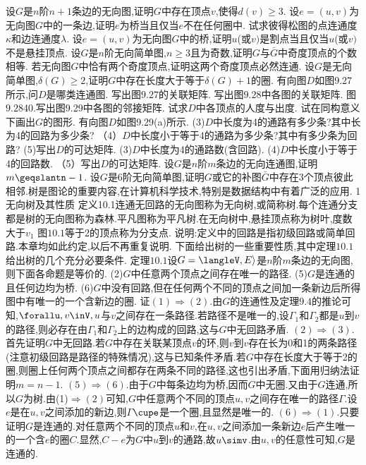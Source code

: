 设$G$是$n$阶$n+1$条边的无向图,证明$G$中存在顶点$v$,使得$d(v)\geqslant3$.
设$e=(u,v)$为无向图$G$中的一条边,证明$e$为桥当且仅当$e$不在任何圈中.
试求彼得松图的点连通度$\kappa$和边连通度$\lambda$.
设$e=(u,v)$为无向图$G$中的桥,证明$u$(或$v)$是割点当且仅当$u$(或$v)$不是悬挂顶点.
设$G$是$n$阶无向简单图,$n\geqslant3$且为奇数,证明$G$与$\bar{G}$中奇度顶点的个数相等.
若无向图$G$中恰有两个奇度顶点,证明这两个奇度顶点必然连通.
设$G$是无向简单图,$\delta(G)\geqslant2$,证明$G$中存在长度大于等于$\delta(G)+1$的圈.
有向图$D$如图9.27所示,问$D$是哪类连通图.
写出图$9.27$的关联矩阵.
写出图$9.28$中各图的关联矩阵.
图$9.28$40.写出图9.29中各图的邻接矩阵.
试求$D$中各顶点的人度与出度.
试在同构意义下画出$G$的图形.
有向图$D$如图9.29(a)所示.
(3)$D$中长度为4的通路有多少条?其中长为4的回路为多少条?
（4）$D$中长度小于等于4的通路为多少条?其中有多少条为回路?
(5)写出$D$的可达矩阵.
(3)$D$中长度为4的通路数(含回路).
(4)$D$中长度小于等于4的回路数.
（5）写出$D$的可达矩阵.
设$G$是$n$阶$m$条边的无向连通图,证明$m\geqslantn-1$.
设$G$是6阶无向简单图,证明$G$或它的补图$\bar{G}$中存在3个顶点彼此相邻.树是图论的重要内容,在计算机科学技术,特别是数据结构中有着广泛的应用.
{1无向树及其性质}
定义10.1连通无回路的无向图称为无向树,或简称树.每个连通分支都是树的无向图称为森林.平凡图称为平凡树.在无向树中,悬挂顶点称为树叶,度数大于$v_{1}$
图$10.1$等于2的顶点称为分支点.
说明:定义中的回路是指初级回路或简单回路.本章均如此约定,以后不再重复说明.
下面给出树的一些重要性质,其中定理$10.1$给出树的几个充分必要条件.
定理$10.1$设$G=\langleV,E\rangle$是$n$阶$m$条边的无向图,则下面各命题是等价的.
(2)$G$中任意两个顶点之间存在唯一的路径.
(5)$G$是连通的且任何边均为桥.
(6)$G$中没有回路,但在任何两个不同的顶点之间加一条新边后所得图中有唯一的一个含新边的圈.
证$(1)\Rightarrow(2)$.由$G$的连通性及定理$9.4$的推论可知,$\forallu,v\inV,u$与$v$之间存在一条路径.若路径不是唯一的,设$\Gamma_{1}$和$\Gamma_{2}$都是$u$到$v$的路径,则必存在由$\Gamma_{1}$和$\Gamma_{2}$上的边构成的回路,这与$G$中无回路矛盾.
$(2)\Rightarrow(3)$.首先证明$G$中无回路.若$G$中存在关联某顶点$v$的环,则$v$到$v$存在长为0和1的两条路径(注意初级回路是路径的特殊情况),这与已知条件矛盾.若$G$中存在长度大于等于2的圈,则圈上任何两个顶点之间都存在两条不同的路径,这也引出矛盾,下面用归纳法证明$m=$$n-1.$
$(5)\Rightarrow(6)$.由于$G$中每条边均为桥,因而$G$中无圈.又由于$G$连通,所以$G$为树.由(1)$\Rightarrow(2)$可知,$G$中任意两个不同的顶点$u,v$之间存在唯一的路径$\Gamma$.设$e$是在$u,v$之间添加的新边,则$\Gamma$$\cupe$是一个圈,且显然是唯一的.
$(6)\Rightarrow(1)$.只要证明$G$是连通的.对任意两个不同的顶点$u$和$v$,在$u,v$之间添加一条新边$e$后产生唯一的一个含$e$的圈$C$.显然,$C-e$为$G$中$u$到$v$的通路,故$u\simv$.由$u,v$的任意性可知,$G$是连通的.
